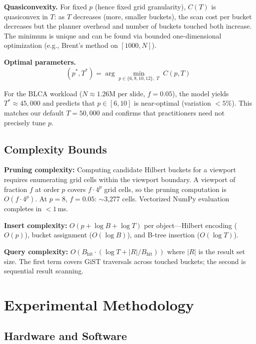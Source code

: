 \documentclass[sigconf]{acmart}
\begin{document}
\textbf{Quasiconvexity.}
For fixed $p$ (hence fixed grid granularity), $C(T)$ is quasiconvex in $T$:
as $T$ decreases (more, smaller buckets), the scan cost per bucket decreases but the planner overhead and number of buckets touched both increase.
The minimum is unique and can be found via bounded one-dimensional optimization (e.g., Brent's method on $[1000, N]$).

\textbf{Optimal parameters.}
\begin{equation}
(p^*, T^*) = \arg\min_{p \in \{6,8,10,12\},\; T} \; C(p, T)
\label{eq:optimal}
\end{equation}

For the BLCA workload ($N \approx 1.26\text{M per slide}$, $f = 0.05$), the model yields $T^* \approx 45{,}000$ and predicts that $p \in [6, 10]$ is near-optimal (variation $< 5\%$).
This matches our default $T = 50{,}000$ and confirms that practitioners need not precisely tune $p$.

\subsection{Complexity Bounds}
\label{sec:complexity}

\textbf{Pruning complexity:}
Computing candidate Hilbert buckets for a viewport requires enumerating grid cells within the viewport boundary.
A viewport of fraction $f$ at order $p$ covers $f \cdot 4^p$ grid cells, so the pruning computation is $O(f \cdot 4^p)$.
At $p = 8$, $f = 0.05$: $\sim$3{,}277 cells.
Vectorized NumPy evaluation completes in $< 1$\,ms.

\textbf{Insert complexity:}
$O(p + \log B + \log T)$ per object---Hilbert encoding ($O(p)$), bucket assignment ($O(\log B)$), and B-tree insertion ($O(\log T)$).

\textbf{Query complexity:}
$O(B_{\text{hit}} \cdot (\log T + |R|/B_{\text{hit}}))$ where $|R|$ is the result set size.
The first term covers GiST traversals across touched buckets; the second is sequential result scanning.

\section{Experimental Methodology}
\label{sec:methodology}

\subsection{Hardware and Software}
\end{document}
